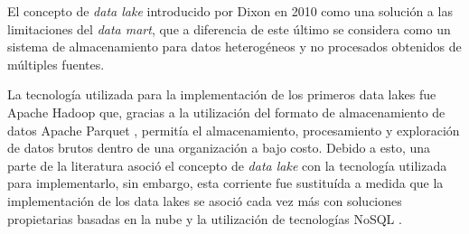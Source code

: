 El concepto de \textit{data lake} introducido por Dixon \cite{dixon2010lake} en 2010 como una solución a las limitaciones del \textit{data mart}, que a diferencia de este
\'ultimo se considera como un sistema de almacenamiento para datos heterogéneos y no procesados obtenidos de múltiples fuentes.

La tecnología utilizada para la implementación de los primeros data lakes fue Apache Hadoop \cite{hadoop} que,
gracias a la utilización del formato de almacenamiento de datos Apache Parquet \cite{parquet},
permitía el almacenamiento,
procesamiento y exploración de datos brutos dentro de una organización a bajo costo.
Debido a esto, una parte de la literatura \cite{o2014embedding,fang2015managing} asoció el concepto de \textit{data lake} con la tecnología utilizada para implementarlo, 
sin embargo, esta corriente fue sustituída a medida que la implementación de los data lakes
se asoció cada vez más con soluciones propietarias basadas en la nube y la utilización de tecnologías NoSQL \cite{sirosh2016lake}.

